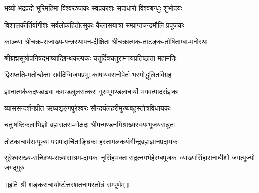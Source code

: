 \twolineshloka
{भव्यो भद्रप्रदो भूरिमहिमा विश्वरञ्जकः}
{स्वप्रकाशः सदाधारो विश्वबन्धुः शुभोदयः}

\twolineshloka
{विशालकीर्तिर्वागीशः सर्वलोकहितोत्सुकः}
{कैलासयात्रा-सम्प्राप्तचन्द्रमौलि-प्रपूजकः}

\twolineshloka
{काञ्च्यां श्रीचक्र-राजाख्य-यन्त्रस्थापन-दीक्षितः}
{श्रीचक्रात्मक-ताटङ्क-तोषिताम्बा-मनोरथः}

\twolineshloka
{श्रीब्रह्मसूत्रोपनिषद्भाष्यादिग्रन्थकल्पकः}
{चतुर्दिक्चतुराम्नायप्रतिष्ठाता महामतिः}

\twolineshloka
{द्विसप्तति-मतोच्छेत्ता सर्वदिग्विजयप्रभुः}
{काषायवसनोपेतो भस्मोद्धूलितविग्रहः}

\twolineshloka
{ज्ञानात्मकैकदण्डाढ्यः कमण्डलुलसत्करः}
{गुरुभूमण्डलाचार्यो भगवत्पादसंज्ञकः}

\twolineshloka
{व्याससन्दर्शनप्रीत ऋष्यशृङ्गपुरेश्वरः}
{सौन्दर्यलहरीमुख्यबहुस्तोत्रविधायकः}

\twolineshloka
{चतुःषष्टिकलाभिज्ञो ब्रह्मराक्षस-मोक्षदः}
{श्रीमन्मण्डनमिश्राख्यस्वयम्भूजयसन्नुतः}

\twolineshloka
{तोटकाचार्यसम्पूज्यः पद्मपादार्चिताङ्घ्रिकः}
{हस्तामलकयोगीन्द्रब्रह्मज्ञानप्रदायकः}

\threelineshloka
{सुरेश्वराख्य-सच्छिष्य-सन्न्यासाश्रम-दायकः}
{नृसिंहभक्तः सद्रत्नगर्भहेरम्बपूजकः}
{व्याख्यासिंहासनाधीशो जगत्पूज्यो जगद्गुरुः}

॥इति श्री शङ्कराचार्याष्टोत्तरशतनामस्तोत्रं सम्पूर्णम्॥
